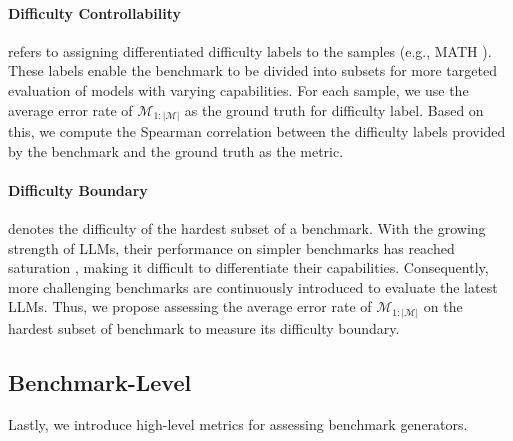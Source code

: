 \paragraph{Difficulty Controllability}refers to assigning differentiated difficulty labels to the samples (e.g., MATH \citep{math}). These labels enable the benchmark to be divided into subsets for more targeted evaluation of models with varying capabilities. For each sample, we use the average error rate of $\mathcal{M}_{1:|\mathcal{M}|}$ as the ground truth for difficulty label. Based on this, we compute the Spearman correlation between the difficulty labels provided by the benchmark and the ground truth as the metric.
\paragraph{Difficulty Boundary} denotes the difficulty of the hardest subset of a benchmark.
With the growing strength of LLMs, their performance on simpler benchmarks has reached saturation \cite{mmlu}, making it difficult to differentiate their capabilities.
Consequently, more challenging benchmarks \citep{mmlupro} are continuously introduced to evaluate the latest LLMs.
Thus, we propose assessing the average error rate of $\mathcal{M}_{1:|\mathcal{M}|}$ on the hardest subset of benchmark to measure its difficulty boundary.


\subsection{Benchmark-Level}
\label{sec:benchmarklevel}
Lastly, we introduce high-level metrics for assessing benchmark generators.
